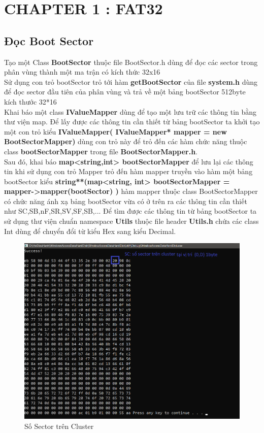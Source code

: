 
\section{CHAPTER 1 : FAT32}
\subsection{Đọc Boot Sector}

Tạo một Class \textbf{BootSector} thuộc file BootSector.h dùng để đọc các sector trong phân vùng thành một ma trận có kích thức 32x16 \\
\indent
Sử dụng con trỏ bootSector trỏ tới hàm \textbf{getBootSector} của file \textbf{system.h} dùng để đọc sector đầu tiên của phân vùng và trả về một bảng bootSector 512byte kích thước 32*16\\
\indent
Khai báo một class \textbf{IValueMapper} dùng để tạo một lưu trữ các thông tin bằng thư viện map. Để lấy được các thông tin cần thiết từ bảng bootSector ta khởi tạo một con trỏ kiểu \textbf{IValueMapper( IValueMapper* mapper = new BootSectorMapper)} dùng con trỏ này để trỏ đến các hàm chức năng thuộc class \textbf{bootSectorMapper} trong file \textbf{BootSectorMapper.h}.\\
\indent 
Sau đó, khai báo  \textbf{map<string,int> bootSectorMapper} để lưu lại các thông tin khi sử dụng con trỏ Mapper trỏ đến hàm mapper truyền vào hàm một bảng bootSector kiểu \textbf{string**(map<string, int> bootSectorMapper = mapper->mapper(bootSector) )} hàm mapper thuộc class BootSectorMapper có chức năng ánh xạ bảng bootSector vừa có ở trên ra các thông tin cần thiết như SC,SB,nF,SR,SV,SF,SB,... Để tìm được các thông tin từ bảng bootSector ta sử dụng thư viện chuẩn namespace \textbf{Utils} thuộc file header \textbf{Utils.h} chứa các class Int dùng để chuyển đổi từ kiểu Hex sang kiểu Decimal.\\

\begin{figure}[htp]
    \centering
    \includegraphics[scale=.5]{CHAPTER 1/Images/SC.png}
    \caption{Số Sector trên Cluster}
    \label{fig:my_label}
\end{figure}

